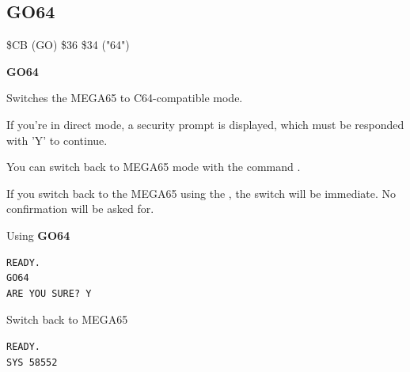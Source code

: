 \subsection{GO64}
\begin{description}[leftmargin=2cm,style=nextline]
\item [Token:]    \$CB (GO) \$36 \$34 ("64")

\item [Format:]   {\bf GO64}

\item [Usage:]    Switches the MEGA65 to C64-compatible mode.

                  If you're in direct mode, a security prompt  is displayed, which must be responded with 'Y' to continue.

                  You can switch back to MEGA65 mode with the command .

\item [Remarks:]  If you switch back to the MEGA65 using the , the switch will be immediate. No confirmation will be asked for.

\item [Example:]  Using {\bf GO64}

\begin{tcolorbox}[colback=black,coltext=white]
\verbatimfont{\codefont}
\begin{verbatim}
READY.
GO64
ARE YOU SURE? Y
\end{verbatim}
\end{tcolorbox}

                  Switch back to MEGA65

\begin{tcolorbox}[colback=black,coltext=white]
\verbatimfont{\codefont}
\begin{verbatim}
READY.
SYS 58552
\end{verbatim}
\end{tcolorbox}
\end{description}


\newpage
